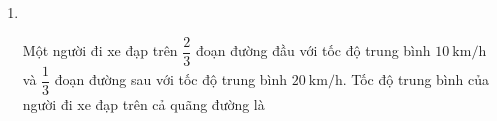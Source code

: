 \begin{enumerate}[label=\bfseries Câu \arabic*:,leftmargin=1.5cm]
	\item {}\\
	{Một người đi xe đạp trên $\dfrac{2}{3}$ đoạn đường đầu với tốc độ trung bình $\SI{10}{\kilo\meter/\hour}$ và $\dfrac{1}{3}$ đoạn đường sau với tốc độ trung bình $\SI{20}{\kilo\meter/\hour}$. Tốc độ trung bình của người đi xe đạp trên cả quãng đường là
	}
\end{enumerate}
